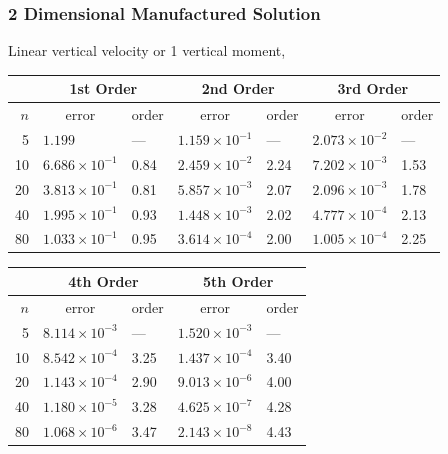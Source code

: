 \documentclass[10pt]{beamer}
\begin{document}
\begin{frame}
  \frametitle{2 Dimensional Manufactured Solution}
  Linear vertical velocity or 1 vertical moment,
  \footnotesize
  \begin{table}
    \centering
    \begin{tabular}{r*{6}l}
      \toprule
            & \multicolumn{2}{c}{1st Order} & \multicolumn{2}{c}{2nd Order} & \multicolumn{2}{c}{3rd Order}                                               \\
      \midrule
      \(n\) & \multicolumn{1}{c}{error}     & order                         & \multicolumn{1}{c}{error}     & order & \multicolumn{1}{c}{error}   & order \\
      \midrule
      5     & \( 1.199 \)                   & ---                           & \( 1.159 \times 10^{-1 } \)   & ---   & \( 2.073 \times 10^{-2 } \) & ---   \\
      10    & \( 6.686 \times 10^{-1 } \)   & 0.84                          & \( 2.459 \times 10^{-2 } \)   & 2.24  & \( 7.202 \times 10^{-3 } \) & 1.53  \\
      20    & \( 3.813 \times 10^{-1 } \)   & 0.81                          & \( 5.857 \times 10^{-3 } \)   & 2.07  & \( 2.096 \times 10^{-3 } \) & 1.78  \\
      40    & \( 1.995 \times 10^{-1 } \)   & 0.93                          & \( 1.448 \times 10^{-3 } \)   & 2.02  & \( 4.777 \times 10^{-4 } \) & 2.13  \\
      80    & \( 1.033 \times 10^{-1 } \)   & 0.95                          & \( 3.614 \times 10^{-4 } \)   & 2.00  & \( 1.005 \times 10^{-4 } \) & 2.25  \\
      \bottomrule
    \end{tabular}
  \end{table}
  \begin{table}
    \centering
    \begin{tabular}{r*{4}l}
      \toprule
            & \multicolumn{2}{c}{4th Order} & \multicolumn{2}{c}{5th Order}                                      \\
      \midrule
      \(n\) & \multicolumn{1}{c}{error}     & order                         & \multicolumn{1}{c}{error}  & order \\
      \midrule
      5     & \( 8.114 \times 10^{-3} \)    & ---                           & \( 1.520 \times 10^{-3} \) & ---   \\
      10    & \( 8.542 \times 10^{-4} \)    & 3.25                          & \( 1.437 \times 10^{-4} \) & 3.40  \\
      20    & \( 1.143 \times 10^{-4} \)    & 2.90                          & \( 9.013 \times 10^{-6} \) & 4.00  \\
      40    & \( 1.180 \times 10^{-5} \)    & 3.28                          & \( 4.625 \times 10^{-7} \) & 4.28  \\
      80    & \( 1.068 \times 10^{-6} \)    & 3.47                          & \( 2.143 \times 10^{-8} \) & 4.43  \\
      \bottomrule
    \end{tabular}
  \end{table}
\end{frame}
\end{document}
